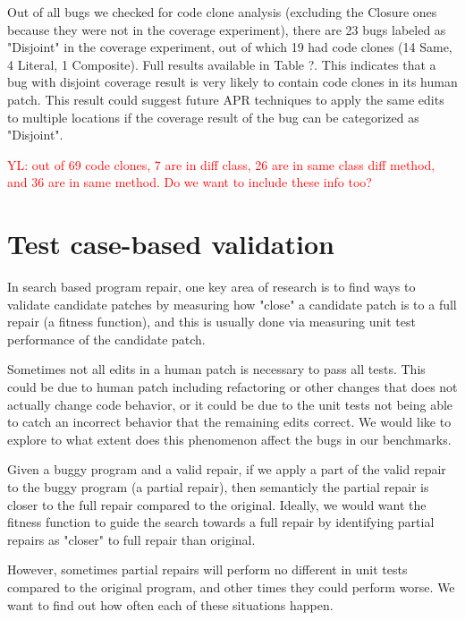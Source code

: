 \documentclass[sigconf, timestamp-false, anonymous=true]{acmart}
\newcommand\todo[1]{\textcolor{red}{#1}}
\begin{document}
Out of all bugs we checked for code clone analysis (excluding the Closure ones because they were not in the coverage experiment), there are 23 bugs labeled as "Disjoint" in the coverage experiment, out of which
19 had code clones (14 Same, 4 Literal, 1 Composite). Full results available in Table ?. This indicates that a 
bug with disjoint coverage result is very likely to contain code clones in its
human patch. This result could suggest future APR techniques to apply the same edits to multiple locations
if the coverage result of the bug can be categorized as "Disjoint". 

\todo{YL: out of 69 code clones, 7 are in diff class, 26 are in same class diff method, and
36 are in same method. Do we want to include these info too?}


\section{Test case-based validation}

In search based program repair, one key area of research is to find ways to validate
candidate patches by
measuring how "close" a candidate patch is to a full repair (a fitness function),
and this is usually done via measuring unit test performance of the candidate patch. 


Sometimes not all edits in a human patch is necessary to pass all tests. This could be
due to human patch including refactoring or other changes that does not actually
change code behavior, or it could be due to the unit tests not being able to catch
an incorrect behavior that the remaining edits correct. We would like to explore
to what extent does this phenomenon affect the bugs in our benchmarks.


Given a buggy program and a valid repair, if we apply a part of the valid repair to 
the buggy program (a partial repair), then semanticly the partial repair is closer
 to the full repair compared to the original. 
Ideally, we would want the fitness function to guide the search towards a full 
repair by identifying partial repairs as "closer" to full repair than original.

However, sometimes partial repairs will perform no different in unit tests compared 
to the original program, and other times they could perform worse. We want to find 
out how often each of these situations happen.
\end{document}
